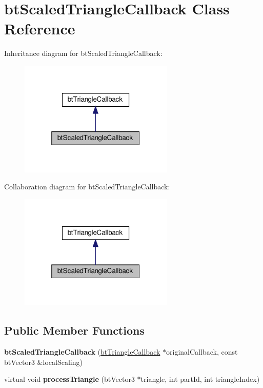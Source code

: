 \hypertarget{classbtScaledTriangleCallback}{}\section{bt\+Scaled\+Triangle\+Callback Class Reference}
\label{classbtScaledTriangleCallback}


Inheritance diagram for bt\+Scaled\+Triangle\+Callback\+:
\nopagebreak
\begin{figure}[H]
\begin{center}
\leavevmode
\includegraphics[width=208pt]{classbtScaledTriangleCallback__inherit__graph}
\end{center}
\end{figure}


Collaboration diagram for bt\+Scaled\+Triangle\+Callback\+:
\nopagebreak
\begin{figure}[H]
\begin{center}
\leavevmode
\includegraphics[width=208pt]{classbtScaledTriangleCallback__coll__graph}
\end{center}
\end{figure}
\subsection*{Public Member Functions}
\begin{DoxyCompactItemize}
\item 
\mbox{\label{classbtScaledTriangleCallback_a5cb45a79992acd5cb276af17af9d5ba4}} 
{\bfseries bt\+Scaled\+Triangle\+Callback} (\hyperlink{classbtTriangleCallback}{bt\+Triangle\+Callback} $\ast$original\+Callback, const bt\+Vector3 \&local\+Scaling)
\item 
\mbox{\label{classbtScaledTriangleCallback_a4eafbc5dc2d56c30dd5e2c0db5cb19b3}} 
virtual void {\bfseries process\+Triangle} (bt\+Vector3 $\ast$triangle, int part\+Id, int triangle\+Index)
\end{DoxyCompactItemize}


